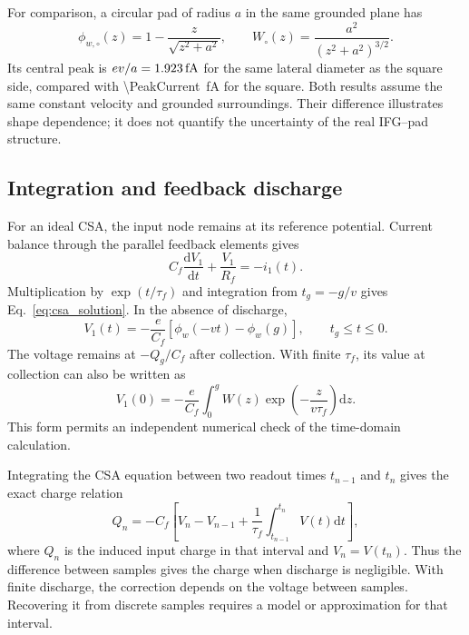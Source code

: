 \documentclass[11pt,a4paper]{article}
\newcommand{\dd}{\mathrm{d}}
\begin{document}
For comparison, a circular pad of radius $a$ in the same grounded plane has
\begin{equation}
 \phi_{w,\circ}(z)=1-\frac{z}{\sqrt{z^2+a^2}},\qquad
 W_\circ(z)=\frac{a^2}{(z^2+a^2)^{3/2}}.
\end{equation}
Its central peak is $ev/a=\SI{1.923}{fA}$ for the same lateral diameter as the square side, compared with \SI{\PeakCurrent}{fA} for the square. Both results assume the same constant velocity and grounded surroundings. Their difference illustrates shape dependence; it does not quantify the uncertainty of the real IFG--pad structure.

\subsection{Integration and feedback discharge}

For an ideal CSA, the input node remains at its reference potential. Current balance through the parallel feedback elements gives
\begin{equation}
 C_f\frac{\dd V_1}{\dd t}+\frac{V_1}{R_f}=-i_1(t).
\end{equation}
Multiplication by $\exp(t/\tau_f)$ and integration from $t_g=-g/v$ gives Eq.~\eqref{eq:csa_solution}. In the absence of discharge,
\begin{equation}
 V_1(t)=-\frac{e}{C_f}[\phi_w(-vt)-\phi_w(g)],
 \qquad t_g\leq t\leq0.
\end{equation}
The voltage remains at $-Q_g/C_f$ after collection. With finite $\tau_f$, its value at collection can also be written as
\begin{equation}
 V_1(0)=-\frac{e}{C_f}\int_0^g W(z)
 \exp\left(-\frac{z}{v\tau_f}\right)\dd z.
 \label{eq:app_csa_quadrature}
\end{equation}
This form permits an independent numerical check of the time-domain calculation.

Integrating the CSA equation between two readout times $t_{n-1}$ and $t_n$ gives the exact charge relation
\begin{equation}
 Q_n=-C_f\left[V_n-V_{n-1}
 +\frac{1}{\tau_f}\int_{t_{n-1}}^{t_n}V(t)\dd t\right],
 \label{eq:app_bucket_charge}
\end{equation}
where $Q_n$ is the induced input charge in that interval and $V_n=V(t_n)$. Thus the difference between samples gives the charge when discharge is negligible. With finite discharge, the correction depends on the voltage between samples. Recovering it from discrete samples requires a model or approximation for that interval.
\end{document}
